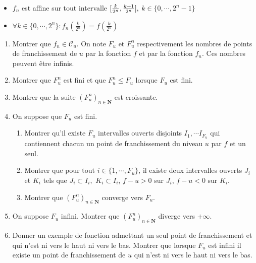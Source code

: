 \begin{itemize}
\item  $f_{n}$ est affine sur tout intervalle $[ \frac{k}{2^{n}},\frac{%
k+1}{2^{n}}] ,$ $k\in \{ 0,\cdots ,2^{n}-1\} $

\item  $\forall k\in \{ 0,\cdots ,2^{n}\} :f_{n}(\frac{k}{2^{n}}%
)=f(\frac{k}{2^{n}})$
\end{itemize}

\begin{enumerate}
\item  Montrer que $f_{n}\in \mathcal{C}_{u}$. On note $F_{u}$ et $F_{u}^{n}$
respectivement les nombres de points de franchissement de $u$ par la
fonction $f$ et par la fonction $f_{n}$. Ces nombres peuvent {\^e}tre
infinis.

\item  Montrer que $F_{u}^{n}$ est fini et que $F_{u}^{n}\leq F_{u}$ lorsque
$F_{u}$ est fini.

\item  Montrer que la suite $(F_{u}^{n})_{n\in \mathbf{N}}$ est croissante.

\item  On suppose que $F_{u}$ est fini.

\begin{enumerate}
\item  Montrer qu'il existe $F_{u}$ intervalles ouverts disjoints $%
I_{1},\cdots I_{F_{u}}$ qui contiennent chacun un point de franchissement du
niveau $u$ par $f$ et un seul.

\item  Montrer que pour tout $i\in \{ 1,\cdots ,F_{u}\} $, il
existe deux intervalles ouverts $J_{i}$ et $K_{i}$ tels que $J_{i}\subset
I_{i},$ $K_{i}\subset I_{i}$, $f-u>0$ sur $J_{i}$, $f-u<0$ sur $K_{i}$.

\item  Montrer que $(F_{u}^{n})_{n\in \mathbf{N}}$ converge vers $F_{u}$.
\end{enumerate}

\item  On suppose $F_{u}$ infini. Montrer que $(F_{u}^{n})_{n\in \mathbf{N}}$
diverge vers $+\infty $.

\item Donner un exemple de fonction admettant un seul point de franchissement et
qui n'est ni vers le haut ni vers le bas.\newline
 Montrer que lorsque $F_{u}$ est infini il existe un point de franchissement de
$u$ qui n'est ni vers le haut ni vers le bas.
\end{enumerate}
